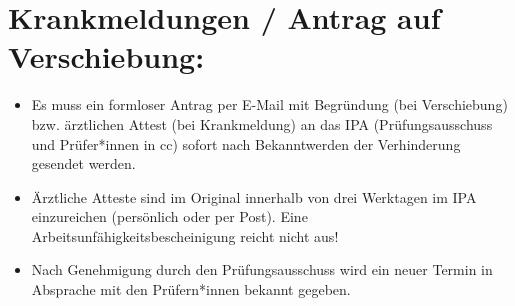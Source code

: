 \documentclass{article}%
\begin{document}
\section*{Krankmeldungen / Antrag auf Verschiebung: }
%
\begin{itemize}
\item Es muss ein formloser Antrag per E-Mail mit Begründung (bei Verschiebung) bzw. ärztlichen Attest (bei Krankmeldung) an das IPA (Prüfungsausschuss und Prüfer*innen in cc) sofort nach Bekanntwerden der Verhinderung gesendet werden.
\item Ärztliche Atteste sind im Original innerhalb von drei Werktagen im IPA einzureichen (persönlich oder per Post). Eine Arbeitsunfähigkeitsbescheinigung reicht nicht aus!
\item Nach Genehmigung durch den Prüfungsausschuss wird ein neuer Termin in Absprache mit den Prüfern*innen bekannt gegeben.
\end{itemize}
%
\end{document}
